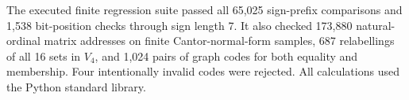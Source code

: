 The executed finite regression suite passed all 65,025 sign-prefix comparisons and 1,538 bit-position checks through sign length 7. It also checked 173,880 natural-ordinal matrix addresses on finite Cantor-normal-form samples, 687 relabellings of all 16 sets in $V_4$, and 1,024 pairs of graph codes for both equality and membership. Four intentionally invalid codes were rejected. All calculations used the Python standard library.
